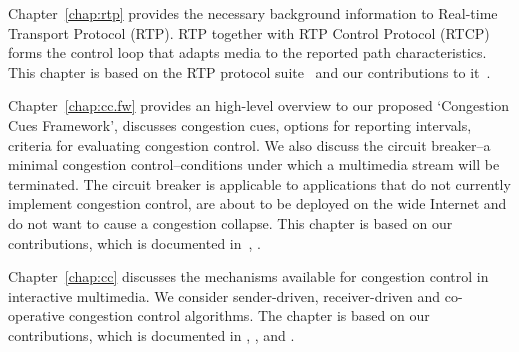 
Chapter~\ref{chap:rtp} provides the necessary background information to 
Real-time Transport Protocol (RTP). RTP together with RTP Control Protocol (RTCP)
forms the control loop that adapts media to the reported path characteristics.
This chapter is based on the RTP protocol suite~\cite{rfc3550, rfc4585,
rfc3611, rfc5104, rfc5506} and our contributions to
it~\cite{rfc7097, rfc7005, draft.xr.bytes.discarded}.


Chapter~\ref{chap:cc.fw} provides an high-level overview to our proposed
`Congestion Cues Framework', discusses congestion cues, options for reporting
intervals, criteria for evaluating congestion control. We also discuss the
circuit breaker--a minimal congestion control--conditions under which a
multimedia stream will be terminated. The circuit breaker is applicable to
applications that do not currently implement congestion control, are about to
be deployed on the wide Internet and do not want to cause a congestion
collapse. This chapter is based on our contributions, which is documented
in~\cite{Singh:control.loops.api, draft.rmcat.app.interaction,
draft.rmcat.evaluate, Singh:PhDFw, draft.rtp.cb}, .



Chapter~\ref{chap:cc} discusses the mechanisms available for congestion
control in interactive multimedia. We consider sender-driven, receiver-driven
and co-operative congestion control algorithms. The chapter is based on our
contributions, which is documented in , ,
\cite{singh:2010.thesis} and .



